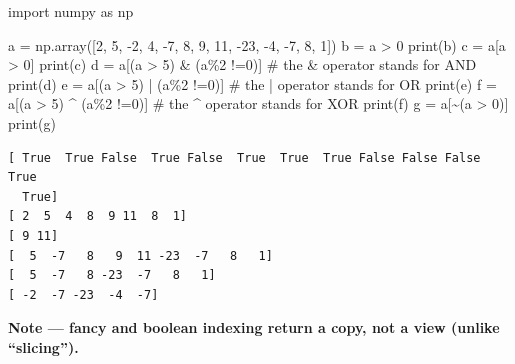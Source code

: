 \documentclass[
  english,
  letterpaper,
  DIV=11,
  numbers=noendperiod]{scrreprt}
\newenvironment{Shaded}{\begin{snugshade}}{\end{snugshade}}
\newcommand{\BuiltInTok}[1]{\textcolor[rgb]{0.00,0.23,0.31}{#1}}
\newcommand{\CommentTok}[1]{\textcolor[rgb]{0.37,0.37,0.37}{#1}}
\newcommand{\DecValTok}[1]{\textcolor[rgb]{0.68,0.00,0.00}{#1}}
\newcommand{\ImportTok}[1]{\textcolor[rgb]{0.00,0.46,0.62}{#1}}
\newcommand{\NormalTok}[1]{\textcolor[rgb]{0.00,0.23,0.31}{#1}}
\newcommand{\OperatorTok}[1]{\textcolor[rgb]{0.37,0.37,0.37}{#1}}
\begin{document}
\begin{Shaded}
\begin{Highlighting}[]
\ImportTok{import}\NormalTok{ numpy }\ImportTok{as}\NormalTok{ np}

\NormalTok{a }\OperatorTok{=}\NormalTok{ np.array([}\DecValTok{2}\NormalTok{, }\DecValTok{5}\NormalTok{, }\OperatorTok{{-}}\DecValTok{2}\NormalTok{, }\DecValTok{4}\NormalTok{, }\OperatorTok{{-}}\DecValTok{7}\NormalTok{, }\DecValTok{8}\NormalTok{, }\DecValTok{9}\NormalTok{, }\DecValTok{11}\NormalTok{, }\OperatorTok{{-}}\DecValTok{23}\NormalTok{, }\OperatorTok{{-}}\DecValTok{4}\NormalTok{, }\OperatorTok{{-}}\DecValTok{7}\NormalTok{, }\DecValTok{8}\NormalTok{, }\DecValTok{1}\NormalTok{])}
\NormalTok{b }\OperatorTok{=}\NormalTok{ a }\OperatorTok{\textgreater{}} \DecValTok{0}
\BuiltInTok{print}\NormalTok{(b)}
\NormalTok{c }\OperatorTok{=}\NormalTok{ a[a }\OperatorTok{\textgreater{}} \DecValTok{0}\NormalTok{]}
\BuiltInTok{print}\NormalTok{(c)}
\NormalTok{d }\OperatorTok{=}\NormalTok{ a[(a }\OperatorTok{\textgreater{}} \DecValTok{5}\NormalTok{) }\OperatorTok{\&}\NormalTok{ (a}\OperatorTok{\%}\DecValTok{2} \OperatorTok{!=}\DecValTok{0}\NormalTok{)] }\CommentTok{\# the \& operator stands for AND}
\BuiltInTok{print}\NormalTok{(d)}
\NormalTok{e }\OperatorTok{=}\NormalTok{ a[(a }\OperatorTok{\textgreater{}} \DecValTok{5}\NormalTok{) }\OperatorTok{|}\NormalTok{ (a}\OperatorTok{\%}\DecValTok{2} \OperatorTok{!=}\DecValTok{0}\NormalTok{)] }\CommentTok{\# the | operator stands for OR}
\BuiltInTok{print}\NormalTok{(e)}
\NormalTok{f }\OperatorTok{=}\NormalTok{ a[(a }\OperatorTok{\textgreater{}} \DecValTok{5}\NormalTok{) }\OperatorTok{\^{}}\NormalTok{ (a}\OperatorTok{\%}\DecValTok{2} \OperatorTok{!=}\DecValTok{0}\NormalTok{)] }\CommentTok{\# the \^{} operator stands for XOR}
\BuiltInTok{print}\NormalTok{(f)}
\NormalTok{g }\OperatorTok{=}\NormalTok{ a[}\OperatorTok{\textasciitilde{}}\NormalTok{(a }\OperatorTok{\textgreater{}} \DecValTok{0}\NormalTok{)]}
\BuiltInTok{print}\NormalTok{(g)}
\end{Highlighting}
\end{Shaded}

\begin{verbatim}
[ True  True False  True False  True  True  True False False False  True
  True]
[ 2  5  4  8  9 11  8  1]
[ 9 11]
[  5  -7   8   9  11 -23  -7   8   1]
[  5  -7   8 -23  -7   8   1]
[ -2  -7 -23  -4  -7]
\end{verbatim}

\textbf{Note --- fancy and boolean indexing return a copy, not a view
(unlike ``slicing'').}
\end{document}
